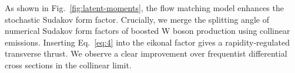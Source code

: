 As shown in Fig.~\ref{fig:latent-moments}, the flow matching model
enhances the stochastic Sudakov form factor. Crucially, we merge the
splitting angle of numerical Sudakov form factors of boosted W boson
production using collinear emissions. Inserting Eq.~\eqref{eq:4} into
the eikonal factor gives a rapidity-regulated transverse thrust. We
observe a clear improvement over frequentist differential cross sections
in the collinear limit.

